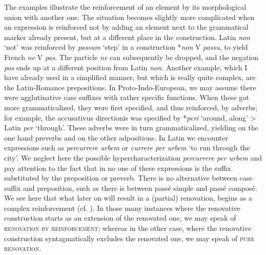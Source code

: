 The examples illustrate the reinforcement of an element by its morphological union with another one. The situation becomes slightly more complicated when an expression is reinforced not by adding an element next to the grammatical marker already present, but at a different place in the construction. Latin \textit{non} ‘not’ was reinforced by \textit{passum} ‘step’ in a construction *\textit{non} V \textit{passu}, to yield French \textit{ne} V \textit{pas}. The particle \textit{ne} can subsequently be dropped, and the negation \textit{pas} ends up at a different position from Latin \textit{non}. Another example, which I have already used in a simplified manner, but which is really quite complex, are the Latin-Romance prepositions. In Proto-Indo-European, we may assume there were agglutinative case suffixes with rather specific functions. When these got more grammaticalized, they were first specified, and thus reinforced, by adverbs; for example, the accusativus directionis was specified by *\textit{peri} ‘around, along’ {\textgreater} Latin \textit{per} ‘through’. These adverbs were in turn grammaticalized, yielding on the one hand preverbs and on the other adpositions. In Latin we encounter expressions such as \textit{percurrere urbem} or \textit{currere per urbem} ‘to run through the city’. We neglect here the possible hypercharacterization \textit{percurrere per urbem} and pay attention to the fact that in no one of these expressions is the suffix substituted by the preposition or preverb. There is no alternative between case suffix and preposition, such as there is between passé simple and passé composé. We see here that what later on will result in a (partial) renovation, begins as a complex reinforcement (cf. \citealt[55]{Jakobson1936}). In those many instances where the renovative construction starts as an extension of the renovated one, we may speak of \textsc{renovation by reinforcement}; whereas in the other case, where the renovative construction syntagmatically excludes the renovated one, we may speak of \textsc{pure renovation}.

